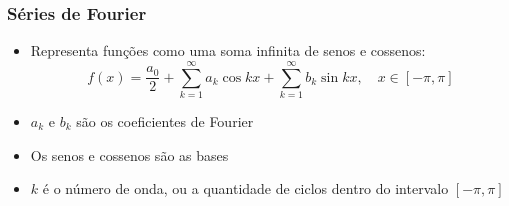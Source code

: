 \documentclass{beamer}
\begin{document}
\begin{frame}
\frametitle{Séries de Fourier}
\begin{itemize}
\item Representa funções como uma soma infinita de senos e cossenos: 
\begin{equation*}
f(x) = \frac{a_{0}}{2}+\sum_{k=1}^{\infty}a_{k} \cos kx + \sum_{k=1}^{\infty}b_{k} \sin kx,  \quad x \in [-\pi, \pi]
\end{equation*}
\item $a_{k}$ e $b_{k}$ são os coeficientes de Fourier
\item Os senos e cossenos são as bases %
\item $k$ é o número de onda, ou a quantidade de ciclos dentro do intervalo $[-\pi, \pi]$
\end{itemize}
\end{frame}
\end{document}
